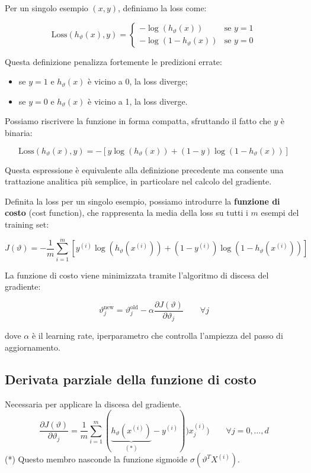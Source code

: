 Per un singolo esempio $(x,y)$, definiamo la loss come:

$$
\text{Loss}(h_\vartheta(x), y) =
\begin{cases}
- \log(h_\vartheta(x)) & \text{se } y = 1 \\[6pt]
- \log(1 - h_\vartheta(x)) & \text{se } y = 0
\end{cases}
$$

Questa definizione penalizza fortemente le predizioni errate:
\begin{itemize}
    \item se $y = 1$ e $h_\vartheta(x)$ è vicino a 0, la loss diverge;
    \item se $y = 0$ e $h_\vartheta(x)$ è vicino a 1, la loss diverge.
\end{itemize}

Possiamo riscrivere la funzione in forma compatta, sfruttando il fatto che $y$ è binaria:

$$
\text{Loss}(h_\vartheta(x), y)
=
- \left[
y \log(h_\vartheta(x)) 
+ 
(1-y)\log(1 - h_\vartheta(x))
\right]
$$

Questa espressione è equivalente alla definizione precedente ma consente una trattazione analitica più semplice, in particolare nel calcolo del gradiente.

\bigskip

Definita la loss per un singolo esempio, possiamo introdurre la \textbf{funzione di costo} (cost function), che rappresenta la media della loss su tutti i $m$ esempi del training set:

$$
J(\vartheta)
=
-\frac{1}{m}
\sum_{i=1}^{m}
\left[
y^{(i)} \log(h_\vartheta(x^{(i)}))
+
(1-y^{(i)}) \log(1 - h_\vartheta(x^{(i)}))
\right]
$$

La funzione di costo viene minimizzata tramite l'algoritmo di discesa del gradiente:

$$
\vartheta_j^{\text{new}}
=
\vartheta_j^{\text{old}}
-
\alpha
\frac{\partial J(\vartheta)}{\partial \vartheta_j}
\qquad \forall j
$$

dove $\alpha$ è il learning rate, iperparametro che controlla l'ampiezza del passo di aggiornamento.


\subsection{Derivata parziale della funzione di costo}

Necessaria per applicare la discesa del gradiente.
$$
\frac{\partial J(\vartheta)}{\partial \vartheta_j} = \frac{1}{m} \sum_{i=1}^{m} (\underbrace{h_\vartheta(x^{(i)})}_{(*)}- y^{(i)}))x_j^{(i)}) \qquad \forall j = 0, \dots, d
$$
(*) Questo membro nasconde la funzione sigmoide $\sigma(\vartheta^TX^{(i)})$.

